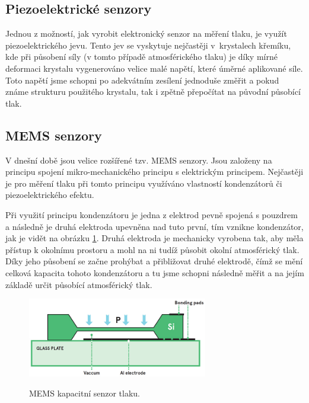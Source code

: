 \subsection{Piezoelektrické senzory}

Jednou z možností, jak vyrobit elektronický senzor na měření tlaku, je využít piezoelektrického jevu. Tento jev se vyskytuje nejčastěji v~krystalech křemíku, kde při působení síly (v tomto případě atmosférického tlaku) je díky mírné deformaci krystalu vygenerováno velice malé napětí, které úměrné aplikované síle. Toto napětí jsme schopni po adekvátním zesílení jednoduše změřit a pokud známe strukturu použitého krystalu, tak i zpětně přepočítat na původní působící tlak.

\subsection{MEMS senzory}

V dnešní době jsou velice rozšířené tzv. MEMS senzory. Jsou založeny na principu spojení mikro-mechanického principu s elektrickým principem. Nejčastěji je pro měření tlaku při tomto principu využíváno vlastností kondenzátorů či piezoelektrického efektu.

Při využití principu kondenzátoru je jedna z elektrod pevně spojená s pouzdrem a následně je druhá elektroda upevněna nad tuto první, tím vznikne kondenzátor, jak je vidět na obrázku \ref{fig_memsCapacitiveSensor}. Druhá elektroda je mechanicky vyrobena tak, aby měla přístup k okolnímu prostoru a mohl na ni tudíž působit okolní atmosférický tlak. Díky jeho působení se začne prohýbat a přibližovat druhé elektrodě, čímž se mění celková kapacita tohoto kondenzátoru a tu jsme schopni následně měřit a na jejím základě určit působící atmosférický tlak.

\begin{figure}
    \includegraphics[width=0.7\textwidth]{obrazky/MEMS_capacitive_sensor.jpg}
    \label{fig_memsCapacitiveSensor}
    \caption{MEMS kapacitní senzor tlaku. \cite{AvnetMEMS}}
\end{figure}

